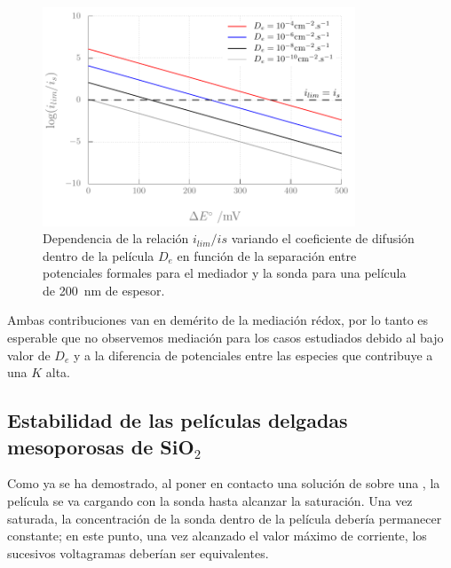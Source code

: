 			\begin{figure}[h!]
				\centering
		 	    \includegraphics[width=0.83\textwidth]{Graficos/ilimite.pdf}
		        \caption[Dependencia de la mediación rédox con $D_e$ y $K$]{Dependencia de la relación $i_{lim}/i{s}$ variando el coeficiente de difusión dentro de la película $D_e$ en función de la separación entre potenciales formales para el mediador y la sonda para una película de \SI{200}{\nm} de espesor.}
		        \label{fig:ilimitee}
		      	\end{figure} 

		\pagebreak Ambas contribuciones van en demérito de la mediación rédox, por lo tanto es esperable que no observemos mediación para los casos estudiados debido al bajo valor de $D_e$ y a la diferencia de potenciales entre las especies que contribuye a una $K$ alta. 	
		
	\subsection{Estabilidad de las películas delgadas mesoporosas de \texorpdfstring{SiO$_2$}{SiO2}}

		Como ya se ha demostrado, al poner en contacto una solución de \ru\space sobre una \pdmF, la película se va cargando con la sonda hasta alcanzar la saturación. Una vez saturada, la concentración de la sonda dentro de la película debería permanecer constante; en este punto, una vez alcanzado el valor máximo de corriente, los sucesivos voltagramas deberían ser equivalentes.

